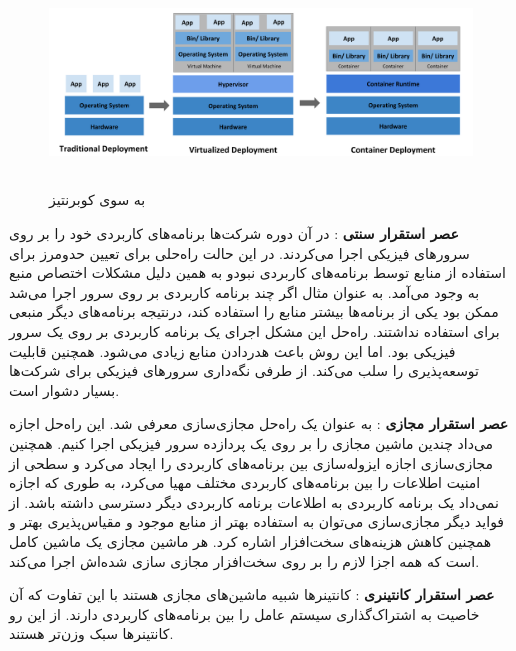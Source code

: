 
\begin{figure}[!h]
	\centering
	\includegraphics[height=5.5cm]{fig2-8}
	\caption{به سوی کوبرنتیز}
	\label{تصویر 2-8}
\end{figure}

\textbf{عصر استقرار سنتی}
: در آن دوره شرکت‌ها برنامه‌های کاربردی خود را بر روی سرورهای فیزیکی اجرا می‌کردند. در این حالت راه‌حلی برای تعیین حد‌و‌مرز برای استفاده از منابع توسط برنامه‌های کاربردی نبودو به همین دلیل مشکلات اختصاص منبع به وجود می‌آمد. به عنوان مثال اگر چند برنامه کاربردی بر روی سرور اجرا می‌شد ممکن بود یکی از برنامه‌ها بیشتر منابع را استفاده کند، درنتیجه برنامه‌های دیگر منبعی برای استفاده نداشتند. راه‌حل این مشکل اجرای یک برنامه کاربردی بر روی یک سرور فیزیکی بود. اما این روش باعث هدر‌دادن منابع زیادی می‌شود. همچنین قابلیت توسعه‌پذیری را سلب می‌کند. از طرفی نگه‌داری سرورهای فیزیکی برای شرکت‌ها بسیار دشوار است.  

\textbf{عصر استقرار مجازی}
: به عنوان یک راه‌حل مجازی‌سازی معرفی شد. این راه‌حل اجازه می‌داد چندین ماشین مجازی را بر روی یک پردازده سرور فیزیکی اجرا کنیم. همچنین مجازی‌سازی اجازه ایزوله‌سازی بین برنامه‌های کاربردی را ایجاد می‌کرد و سطحی از امنیت اطلاعات را بین برنامه‌های کاربردی مختلف مهیا می‌کرد، به طوری که اجازه نمی‌داد یک برنامه کاربردی به اطلاعات برنامه کاربردی دیگر دسترسی داشته باشد. از فواید دیگر مجازی‌سازی می‌توان به استفاده بهتر از منابع موجود و مقیاس‌پذیری بهتر و همچنین کاهش هزینه‌های سخت‌افزار اشاره کرد. هر ماشین مجازی یک ماشین کامل است که همه اجزا لازم  را بر روی سخت‌افزار مجازی سازی‌ شده‌اش اجرا می‌کند.

\textbf{عصر استقرار کانتینری}
: کانتینرها شبیه ماشین‌های مجازی هستند با این تفاوت که آن خاصیت به اشتراک‌گذاری سیستم عامل را بین برنامه‌های کاربردی دارند. از این رو کانتینرها سبک وزن‌تر هستند. 
\newline

